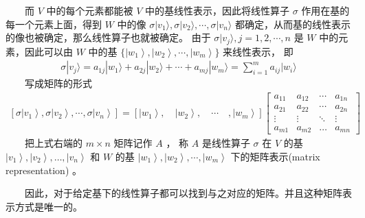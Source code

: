 \documentclass[a4paper,11pt,english]{sphinxmanual}
\begin{document}
\sphinxAtStartPar
​  而 \(V\) 中的每个元素都能被 \(V\) 中的基线性表示，因此将线性算子  \(\sigma\) 作用在基的每一个元素上面，得到 \(W\) 中的像  \(\sigma|v_{1}\rangle, \sigma|v_{2}\rangle, \cdots, \sigma|v_{n}\rangle\) 都确定，从而基的线性表示的像也被确定，那么线性算子也就被确定。 由于  \(\sigma|v_{j}\rangle, j=1,2, \cdots, n\) 是 \(W\) 中的元素，因此可以由 \(W\) 中的基  \(\{\left|w_{1}\right\rangle,\left|w_{2}\right\rangle, \cdots,\left|w_{m}\right\rangle\}\) 来线性表示， 即
\begin{equation*}
\begin{split}\sigma|v_{j}\rangle=a_{1 j}|w_{1}\rangle+a_{2 j}|w_{2}\rangle+\cdots+a_{m j}|w_{m}\rangle=\sum_{i=1}^{m} a_{i j}|w_{i}\rangle\end{split}
\end{equation*}
\sphinxAtStartPar
​  写成矩阵的形式
\begin{equation*}
\begin{split}\left[\sigma\left|v_{1}\right\rangle, \sigma\left|v_{2}\right\rangle, \cdots, \sigma\left|v_{n}\right\rangle\right]=\left[\left|w_{1}\right\rangle, \quad\left|w_{2}\right\rangle, \quad \cdots \quad,\left|w_{m}\right\rangle\right]\left[\begin{array}{cccc} a_{11} & a_{12} & \cdots & a_{1 n} \\ a_{21} & a_{22} & \cdots & a_{2 n} \\ \vdots & \vdots & \ddots & \vdots \\ a_{m 1} & a_{m 2} & \ldots & a_{m n} \end{array}\right]\end{split}
\end{equation*}
\sphinxAtStartPar
​  把上式右端的  \(m \times n\) 矩阵记作 \(A\) ， 称  \(A\)  是线性算子  \(\sigma\) 在 \(V\) 的基 \(\left|v_{1}\right\rangle,\left|v_{2}\right\rangle, \ldots,\left|v_{n}\right\rangle\) 和 \(W\) 的基  \(\left|w_{1}\right\rangle,\left|w_{2}\right\rangle, \cdots,\left|w_{m}\right\rangle\) 下的矩阵表示(matrix representation) 。

\sphinxAtStartPar
​  因此，对于给定基下的线性算子都可以找到与之对应的矩阵。并且这种矩阵表示方式是唯一的。
\end{document}
